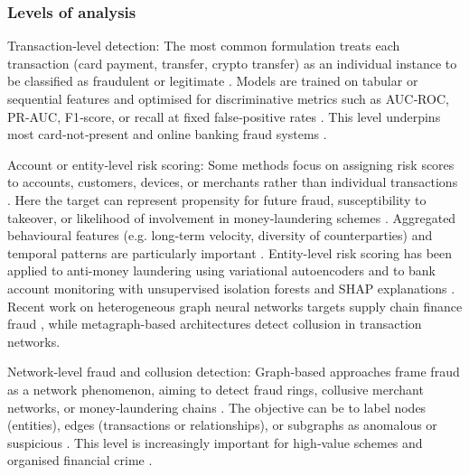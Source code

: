 \documentclass[a4paper,fleqn]{cas-dc}
\begin{document}
\subsubsection{Levels of analysis}
Transaction‑level detection: The most common formulation treats each transaction (card payment, transfer, crypto transfer) as an individual instance to be classified as fraudulent or legitimate \cite{bin_sulaiman_review_2022, cherif_credit_2023, ahmed_secure_2024, adil_optdevnet_2024, karthika_smart_2023, karthikeyan_intelligent_2023, madhavappa_efficient_2025, abdullah_machine_2024, ravindranath_evaluation_2024}. 
Models are trained on tabular or sequential features and optimised for discriminative metrics such as AUC‑ROC, PR‑AUC, F1‑score, or recall at fixed false‑positive rates \cite{almazroi_online_2023, kennedy_synthesizing_2024}. This level underpins most card‑not‑present and online banking fraud systems \cite{almazroi_online_2023, ranganatha_enhancing_2025}.

Account or entity‑level risk scoring: 
Some methods focus on assigning risk scores to accounts, customers, devices, or merchants rather than individual transactions \cite{talaat_precise_2025, wu_heterogeneous_2024, wei_evaluation_2023, wu_enhanced_2024, zhang_multi-view_2025}. 
Here the target can represent propensity for future fraud, susceptibility to takeover, or likelihood of involvement in money‑laundering schemes \cite{talaat_precise_2025}. 
Aggregated behavioural features (e.g. long‑term velocity, diversity of counterparties) and temporal patterns are particularly important \cite{chen_variational_2021}.
Entity-level risk scoring has been applied to anti-money laundering using variational autoencoders \cite{chen_variational_2021} and to bank account monitoring with unsupervised isolation forests and SHAP explanations \cite{karnavou_i_2025}.
Recent work on heterogeneous graph neural networks targets supply chain finance fraud \cite{wu_heterogeneous_2024}, while metagraph-based architectures detect collusion in transaction networks.

Network‑level fraud and collusion detection: Graph‑based approaches frame fraud as a network phenomenon, aiming to detect fraud rings, collusive merchant networks, or money‑laundering chains \cite{wu_heterogeneous_2024}. The objective can be to label nodes (entities), edges (transactions or relationships), or subgraphs as anomalous or suspicious \cite{van_belle_shine_2024, wu_heterogeneous_2024}. This level is increasingly important for high‑value schemes and organised financial crime \cite{li_fedgat-dcnn_2024}.
\end{document}
